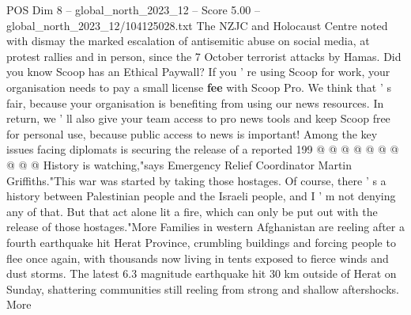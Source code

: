 \begin{textsample}{POS Dim 8 – global\_north\_2023\_12 – Score 5.00 – global\_north\_2023\_12/104125028.txt}
The NZJC and Holocaust Centre noted with dismay the marked escalation of antisemitic abuse on social media, at protest rallies and in person, since the 7 October terrorist attacks by Hamas.
Did you know Scoop has an Ethical Paywall?
If you ' re using Scoop for work, your organisation needs to pay a small license \textbf{fee} with Scoop Pro.
We think that ' s fair, because your organisation is benefiting from using our news resources.
In return, we ' ll also give your team access to pro news tools and keep Scoop free for personal use, because public access to news is important!
Among the key issues facing diplomats is securing the release of a reported 199 @ @ @ @ @ @ @ @ @ @ History is watching,"says Emergency Relief Coordinator Martin Griffiths."This war was started by taking those hostages.
Of course, there ' s a history between Palestinian people and the Israeli people, and I ' m not denying any of that.
But that act alone lit a fire, which can only be put out with the release of those hostages."More Families in western Afghanistan are reeling after a fourth earthquake hit Herat Province, crumbling buildings and forcing people to flee once again, with thousands now living in tents exposed to fierce winds and dust storms.
The latest 6.3 magnitude earthquake hit 30 km outside of Herat on Sunday, shattering communities still reeling from strong and shallow aftershocks.
More

\end{textsample}

